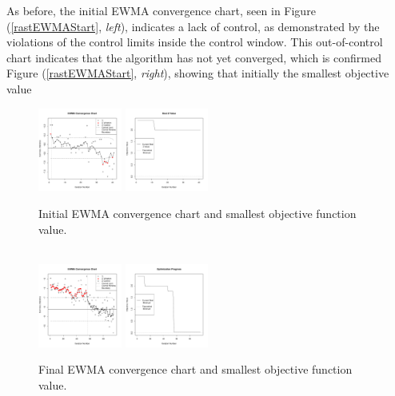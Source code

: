 \documentclass[12pt]{article}
\begin{document}
	
	As before, the initial EWMA convergence chart, seen in Figure (\ref{rastEWMAStart}, {\it left}), indicates a lack of control, as demonstrated by the violations of the control limits inside the control window.
	This out-of-control chart indicates that the algorithm has not yet converged, which is confirmed Figure (\ref{rastEWMAStart}, {\it right}), showing that initially the smallest objective value
	\begin{figure}
	\includegraphics[width=0.245\textwidth]{./figures/ewmaConvChartRastHardStart.pdf}
	\includegraphics[width=0.245\textwidth]{./figures/bestZRastHardStart.pdf}
	\caption{Initial EWMA convergence chart and smallest objective function value. }
	\label{rastEWMAStart}
	$~$\\
	\includegraphics[width=0.245\textwidth]{./figures/ewmaConvChartRastHardEnd.pdf}
	\includegraphics[width=0.245\textwidth]{./figures/bestZRastHardEnd.pdf}
	\caption{Final EWMA convergence chart and smallest objective function value. }
	\label{rastEWMAEnd}
	\end{figure}
\end{document}
